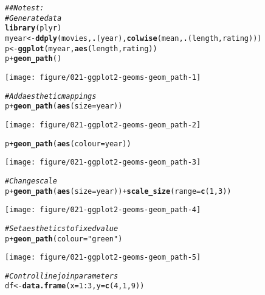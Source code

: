 \documentclass[a4paper,titlepage]{tufte-handout}\usepackage[]{graphicx}\usepackage[]{color}
\makeatletter
\def\maxwidth{ %
  \ifdim\Gin@nat@width>\linewidth
    \linewidth
  \else
    \Gin@nat@width
  \fi
}
\newcommand{\hlnum}[1]{\textcolor[rgb]{0.686,0.059,0.569}{#1}}%
\newcommand{\hlstr}[1]{\textcolor[rgb]{0.192,0.494,0.8}{#1}}%
\newcommand{\hlcom}[1]{\textcolor[rgb]{0.678,0.584,0.686}{\textit{#1}}}%
\newcommand{\hlopt}[1]{\textcolor[rgb]{0,0,0}{#1}}%
\newcommand{\hlstd}[1]{\textcolor[rgb]{0.345,0.345,0.345}{#1}}%
\newcommand{\hlkwb}[1]{\textcolor[rgb]{0.69,0.353,0.396}{#1}}%
\newcommand{\hlkwc}[1]{\textcolor[rgb]{0.333,0.667,0.333}{#1}}%
\newcommand{\hlkwd}[1]{\textcolor[rgb]{0.737,0.353,0.396}{\textbf{#1}}}%
\newenvironment{kframe}{%
 \def\at@end@of@kframe{}%
 \ifinner\ifhmode%
  \def\at@end@of@kframe{\end{minipage}}%
  \begin{minipage}{\columnwidth}%
 \fi\fi%
 \def\FrameCommand##1{\hskip\@totalleftmargin \hskip-\fboxsep
 \colorbox{shadecolor}{##1}\hskip-\fboxsep
     \hskip-\linewidth \hskip-\@totalleftmargin \hskip\columnwidth}%
 \MakeFramed {\advance\hsize-\width
   \@totalleftmargin\z@ \linewidth\hsize
   \@setminipage}}%
 {\par\unskip\endMakeFramed%
 \at@end@of@kframe}
\newenvironment{knitrout}{}{} %
\makeatother
\begin{document}
\begin{knitrout}
\begin{kframe}
\begin{alltt}
\hlcom{## No test: }
\hlcom{# Generate data}
\hlkwd{library}\hlstd{(plyr)}
\hlstd{myear} \hlkwb{<-} \hlkwd{ddply}\hlstd{(movies,} \hlkwd{.}\hlstd{(year),} \hlkwd{colwise}\hlstd{(mean,} \hlkwd{.}\hlstd{(length, rating)))}
\hlstd{p} \hlkwb{<-} \hlkwd{ggplot}\hlstd{(myear,} \hlkwd{aes}\hlstd{(length, rating))}
\hlstd{p} \hlopt{+} \hlkwd{geom_path}\hlstd{()}
\end{alltt}
\end{kframe}
\texttt{[image: figure/021-ggplot2-geoms-geom\_path-1]} 
\begin{kframe}\begin{alltt}
\hlcom{# Add aesthetic mappings}
\hlstd{p} \hlopt{+} \hlkwd{geom_path}\hlstd{(}\hlkwd{aes}\hlstd{(}\hlkwc{size} \hlstd{= year))}
\end{alltt}
\end{kframe}
\texttt{[image: figure/021-ggplot2-geoms-geom\_path-2]} 
\begin{kframe}\begin{alltt}
\hlstd{p} \hlopt{+} \hlkwd{geom_path}\hlstd{(}\hlkwd{aes}\hlstd{(}\hlkwc{colour} \hlstd{= year))}
\end{alltt}
\end{kframe}
\texttt{[image: figure/021-ggplot2-geoms-geom\_path-3]} 
\begin{kframe}\begin{alltt}
\hlcom{# Change scale}
\hlstd{p} \hlopt{+} \hlkwd{geom_path}\hlstd{(}\hlkwd{aes}\hlstd{(}\hlkwc{size} \hlstd{= year))} \hlopt{+} \hlkwd{scale_size}\hlstd{(}\hlkwc{range} \hlstd{=} \hlkwd{c}\hlstd{(}\hlnum{1}\hlstd{,} \hlnum{3}\hlstd{))}
\end{alltt}
\end{kframe}
\texttt{[image: figure/021-ggplot2-geoms-geom\_path-4]} 
\begin{kframe}\begin{alltt}
\hlcom{# Set aesthetics to fixed value}
\hlstd{p} \hlopt{+} \hlkwd{geom_path}\hlstd{(}\hlkwc{colour} \hlstd{=} \hlstr{"green"}\hlstd{)}
\end{alltt}
\end{kframe}
\texttt{[image: figure/021-ggplot2-geoms-geom\_path-5]} 
\begin{kframe}\begin{alltt}
\hlcom{# Control line join parameters}
\hlstd{df} \hlkwb{<-} \hlkwd{data.frame}\hlstd{(}\hlkwc{x} \hlstd{=} \hlnum{1}\hlopt{:}\hlnum{3}\hlstd{,} \hlkwc{y} \hlstd{=} \hlkwd{c}\hlstd{(}\hlnum{4}\hlstd{,} \hlnum{1}\hlstd{,} \hlnum{9}\hlstd{))}

\end{alltt}
\end{kframe}
\end{knitrout}
\end{document}
